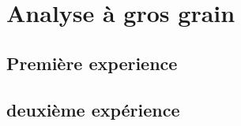 \section{Analyse à gros grain}
\label{sec:analyse_gros_grain}

\subsection{Première experience}

\subsection{deuxième expérience}

